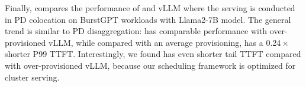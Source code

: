 
\noindent
Finally, {} compares the performance of {\sys} and vLLM
where the serving is conducted in PD colocation on BurstGPT workloads with Llama2-7B model.
The general trend is similar to PD disaggregation:
{\sys} has comparable performance with over-provisioned vLLM,
while compared with an average provisioning,
{\sys} has a 0.24\,$\times$ shorter P99 TTFT.
Interestingly, we found {\sys} has even shorter tail TTFT compared with over-provisioned vLLM,
because our scheduling framework is optimized for cluster serving.